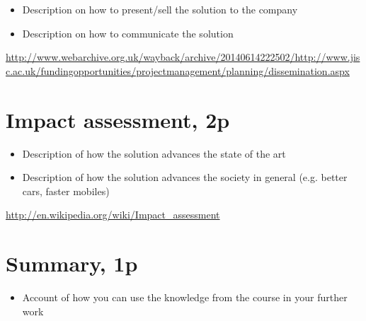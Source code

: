\documentclass{article}
\begin{document}
\begin{itemize}
	\item Description on how to present/sell the solution to the company
	\item Description on how to communicate the solution
\end{itemize}

\url{http://www.webarchive.org.uk/wayback/archive/20140614222502/http://www.jisc.ac.uk/fundingopportunities/projectmanagement/planning/dissemination.aspx}

\section{Impact assessment, 2p}


\begin{itemize}
	\item Description of how the solution advances the state of the art
	\item Description of how the solution advances the society in general (e.g. better cars, faster mobiles)
\end{itemize}

\url{http://en.wikipedia.org/wiki/Impact_assessment}


\section{Summary, 1p}

\begin{itemize}
	\item Account of how you can use the knowledge from the course in your further work
\end{itemize}
\end{document}

